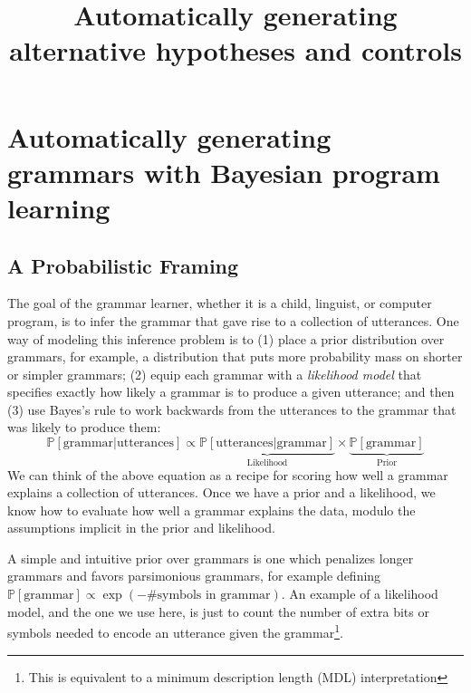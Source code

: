 \documentclass{article}
\title{Automatically generating alternative hypotheses and controls}
\newcommand{\probability}{\mathds{P}} %
\begin{document}
\maketitle


\section{Automatically generating grammars with Bayesian program learning}

\subsection{A Probabilistic Framing}

The goal of the grammar learner, whether it is a child, linguist, or computer program, is to
infer the grammar that gave rise to
a collection of utterances.
One way of
modeling this inference problem is to (1) place a prior distribution over grammars, for example, a distribution that puts more probability mass on shorter or simpler grammars; (2) equip each grammar with a
\emph{likelihood model} that specifies exactly how likely a grammar is to produce a given utterance;
and then (3) use Bayes's rule to work backwards from the
utterances to the grammar that was likely to produce them:
\begin{equation}
  \probability\left[\text{grammar}|\text{utterances} \right]\propto\underbrace{\probability\left[\text{utterances}|\text{grammar} \right]}_{\text{Likelihood}}\times\underbrace{\probability\left[\text{grammar} \right]}_{\text{Prior}}\label{posterior}
\end{equation}
We can think of the above equation as a recipe for
scoring how well a grammar explains a
collection of utterances.
Once we have a prior and a likelihood,
we know how to evaluate how well a grammar explains the data, modulo the assumptions implicit in the
prior and likelihood.

A simple and intuitive prior over grammars is one which penalizes longer grammars and favors parsimonious grammars, for example defining $\probability\left[\text{grammar} \right]\propto\exp\left(- \text{\# symbols in grammar} \right)$. An example of a likelihood model,
and the one we use here,
is just to count the number of extra bits or symbols needed to encode an utterance given the grammar\footnote{This is equivalent to a minimum description length (MDL) interpretation}.
\end{document}
